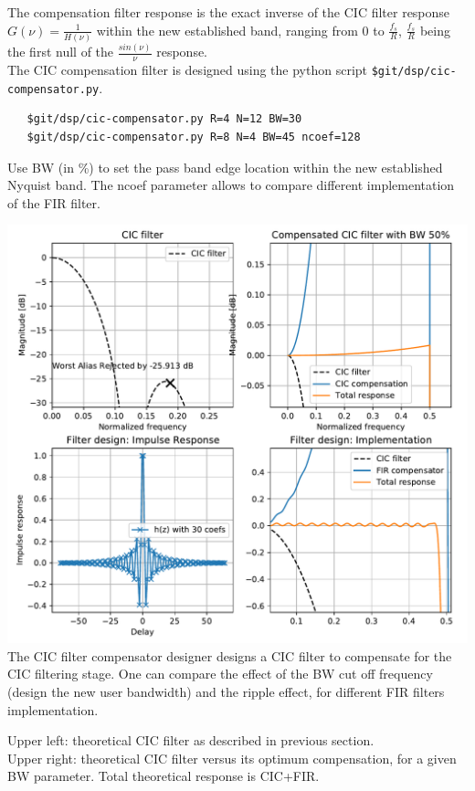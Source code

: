 \documentclass{article}
\begin{document}
The compensation filter response is the exact inverse
of the CIC filter response $G(\nu) = \frac{1}{H(\nu)}$ 
within the new established band, ranging
from 0 to $\frac{f_s}{R}$,
$\frac{f_s}{R}$ being the first null of the $\frac{sin(\nu)}{\nu}$ response. \\

The CIC compensation filter is designed
using the python script {\tt \$git/dsp/cic-compensator.py}. 

\begin{verbatim}
   $git/dsp/cic-compensator.py R=4 N=12 BW=30
   $git/dsp/cic-compensator.py R=8 N=4 BW=45 ncoef=128
\end{verbatim}

Use BW (in \%) to set the pass band edge
location within the new established Nyquist band.
The ncoef parameter allows to compare different
implementation of the FIR filter.

\begin{center}
	\includegraphics[width=0.75\linewidth]{fir-des-2.pdf} \\
	The CIC filter compensator designer designs a CIC
	filter to compensate for the CIC filtering stage.
	One can compare the effect of the BW cut off frequency
	(design the new user bandwidth) and the ripple effect,
	for different FIR filters implementation.
\end{center}

Upper left: theoretical CIC filter as described in previous
section. \\

Upper right: theoretical CIC filter versus its optimum
compensation, for a given BW parameter.
Total theoretical response is CIC+FIR. \\
\end{document}
